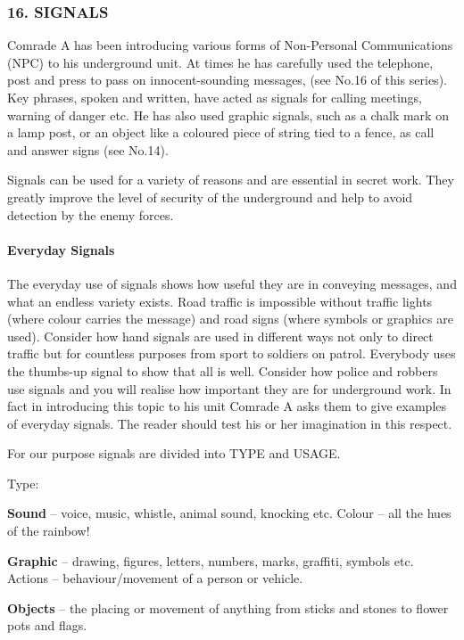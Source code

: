 \subsubsection{16. SIGNALS}

Comrade A has been introducing various forms of Non-Personal
Communications (NPC) to his underground unit. At times he has carefully
used the telephone, post and press to pass on innocent-sounding
messages, (see No.16 of this series). Key phrases, spoken and written,
have acted as signals for calling meetings, warning of danger etc. He
has also used graphic signals, such as a chalk mark on a lamp post, or
an object like a coloured piece of string tied to a fence, as call and
answer signs (see No.14).

Signals can be used for a variety of reasons and are essential in secret
work. They greatly improve the level of security of the underground and
help to avoid detection by the enemy forces.

\paragraph{Everyday Signals}

The everyday use of signals shows how useful they are in conveying
messages, and what an endless variety exists. Road traffic is impossible
without traffic lights (where colour carries the message) and road signs
(where symbols or graphics are used). Consider how hand signals are used
in different ways not only to direct traffic but for countless purposes
from sport to soldiers on patrol. Everybody uses the thumbs-up signal to
show that all is well. Consider how police and robbers use signals and
you will realise how important they are for underground work. In fact in
introducing this topic to his unit Comrade A asks them to give examples
of everyday signals. The reader should test his or her imagination in
this respect.

For our purpose signals are divided into TYPE and USAGE.

{Type:}

\textbf{Sound} -- voice, music, whistle, animal sound, knocking etc.
Colour -- all the hues of the rainbow!

\textbf{Graphic} -- drawing, figures, letters, numbers, marks, graffiti,
symbols etc. Actions -- behaviour/movement of a person or vehicle.

\textbf{Objects} -- the placing or movement of anything from sticks and
stones to flower pots and flags.

